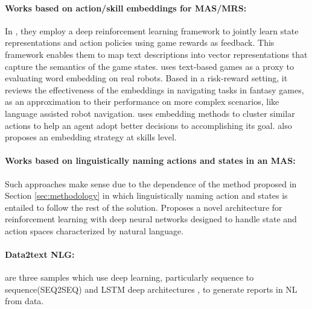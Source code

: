 \documentclass{article}
\begin{document}
\begin{multicols}{2}
		\paragraph{Works based on action/skill embeddings for MAS/MRS:}
		In \citet{narasimhan-2015-language-understanding-for-text-based-games-using-deep-reinforcement-learning}, they employ a deep reinforcement learning framework to jointly learn state representations and action policies using game rewards as feedback. This framework enables them to map text descriptions into vector representations that capture the semantics of the game states. \citet{gulati-2017-playing-with-embeddings-evaluating-embeddings-for-robot-language-learning-through-mud-games} uses text-based games as a proxy to evaluating word embedding on real robots. Based in a risk-reward setting, it reviews the effectiveness of the embeddings in navigating tasks in fantasy games, as an approximation to their performance on more complex scenarios, like language assisted robot navigation. 
		\cite{tennenholtz-2019-the-natural-language-of-actions,chandak-2019-learning-action-representations-for-reinforcement-learning} uses embedding methods to cluster similar actions to help an agent adopt better decisions to accomplishing its goal. \cite{hausman-2018-learning-an-embedding-space-for-transferable-robot-skills} also proposes an embedding strategy at skills level. 
		
		\paragraph{Works based on linguistically naming actions and states in an MAS:}
		Such approaches make sense due to the dependence of the method proposed in Section \ref{sec:methodology} in which linguistically naming action and states is entailed to follow the rest of the solution.  
		\cite{he-2015-deep-reinforcement-learning-with-an-unbounded-action-space} Proposes a novel architecture for reinforcement learning with deep neural networks designed to handle state and action spaces characterized by natural language. 
		
		\paragraph{Data2text NLG:}
		\cite{rosenthal-2016-verbalization-narration-of-autonomous-robot-experience,hastie-2017-talking-autonomous-vehicles-automatic-auv-mission-analysis-in-natural-language,puduppully-2018-data-to-text-generation-with-content-selection-and-planning} are three samples which use deep learning, particularly sequence to sequence(SEQ2SEQ) and LSTM deep architectures \citep{sutskever-2014-sequence-to-sequence-learning-with-neural-networks,hochreiter-1997-long-short-term-memory},  to generate reports in NL from data.
		

\end{multicols}
\end{document}
